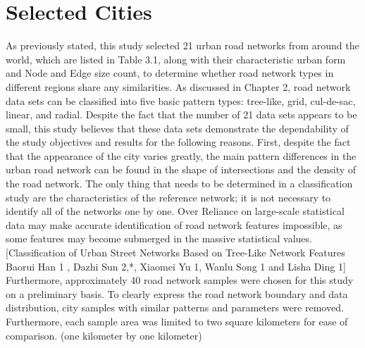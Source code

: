 \section{Selected Cities}
As previously stated, this study selected 21 urban road networks from around the world, which are listed in Table 3.1, along with their characteristic urban form and Node and Edge size count, to determine whether road network types in different regions share any similarities. As discussed in Chapter 2, road network data sets can be classified into five basic pattern types: tree-like, grid, cul-de-sac, linear, and radial. Despite the fact that the number of 21 data sets appears to be small, this study believes that these data sets demonstrate the dependability of the study objectives and results for the following reasons. First, despite the fact that the appearance of the city varies greatly, the main pattern differences in the urban road network can be found in the shape of intersections and the density of the road network. The only thing that needs to be determined in a classification study are the characteristics of the reference network; it is not necessary to identify all of the networks one by one. Over Reliance on large-scale statistical data may make accurate identification of road network features impossible, as some features may become submerged in the massive statistical values. [Classification of Urban Street Networks Based on Tree-Like Network Features Baorui Han 1 , Dazhi Sun 2,*, Xiaomei Yu 1, Wanlu Song 1 and Lisha Ding 1] Furthermore, approximately 40 road network samples were chosen for this study on a preliminary basis. To clearly express the road network boundary and data distribution, city samples with similar patterns and parameters were removed.
Furthermore, each sample area was limited to two square kilometers for ease of comparison. (one kilometer by one kilometer)


